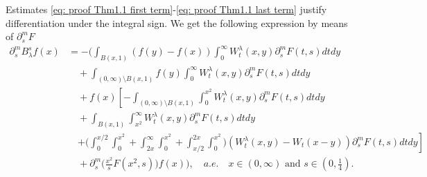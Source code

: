 \documentclass[a4paper,10pt, reqno]{amsart}
\theoremstyle{definition}
\theoremstyle{remark}
\numberwithin{equation}{section}
\begin{document}
Estimates \eqref{eq: proof Thm1.1 first term}-\eqref{eq: proof Thm1.1 last term}  justify differentiation under the integral sign. We get the following expression by means of $\partial_s^m F$
\begin{align*}
    \partial_s^m B_\lambda^sf(x)&=-\Bigg(\int_{B(x,1)}(f(y)-f(x))\int_0^\infty W_t^\lambda (x,y)\partial_s^m F(t,s)dtdy\\
    &\quad +\int_{(0,\infty)\setminus B(x,1)}f(y)\int_0^\infty W_t^\lambda (x,y)\partial_s^m F(t,s)dtdy\\
    &\quad +f(x)\left[-\int_{(0,\infty)\setminus B(x,1)}\int_0^{x^2}W_t^\lambda (x,y)\partial_s^m F(t,s)dtdy\right.\\
    &\quad +\int_{B(x,1)}\int_{x^2}^\infty W_t^\lambda (x,y)\partial_s^m F(t,s)dtdy\\
    &\quad \left.+\Bigg(\int_0^{x/2}\int_0^{x^2}+\int_{2x}^\infty \int_0^{x^2}+\int_{x/2}^{2x}\int_0^{x^2}\Bigg)(W_t^\lambda (x,y)-W_t(x-y))\partial_s^m F(t,s)dtdy\right]\\
    &\quad +\partial_s^m \Big(\frac{x^2}{s}F(x^2,s)\Big)f(x)\Bigg),\quad a.e. \quad x\in (0,\infty)\mbox{ and }s\in \left(0,\tfrac{1}{4}\right).
\end{align*}
\end{document}
